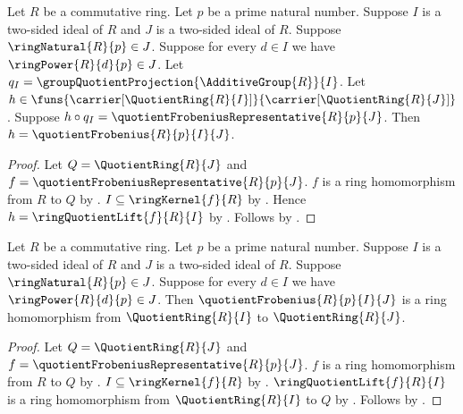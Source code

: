 \begin{theorem}\label{quotient_frobenius_unique}
    Let $R$ be a commutative ring.
    Let $p$ be a prime natural number.
    Suppose $I$ is a two-sided ideal of $R$ and
        $J$ is a two-sided ideal of $R$.
    Suppose $\ringNatural{R}{p}\in J$.
    Suppose for every $d\in I$ we have
        $\ringPower{R}{d}{p}\in J$.
    Let $q_I=\groupQuotientProjection{\AdditiveGroup{R}}{I}$.
    Let $h\in\funs{\carrier[\QuotientRing{R}{I}]}{
        \carrier[\QuotientRing{R}{J}]}$.
    Suppose
        $h\circ q_I=\quotientFrobeniusRepresentative{R}{p}{J}$.
    Then $h=\quotientFrobenius{R}{p}{I}{J}$.
\end{theorem}
\begin{proof}
    Let $Q=\QuotientRing{R}{J}$ and
        $f=\quotientFrobeniusRepresentative{R}{p}{J}$.
    $f$ is a ring homomorphism from $R$ to $Q$ by
        .
    $I\subseteq\ringKernel{f}{R}$ by
        .
    Hence $h=\ringQuotientLift{f}{R}{I}$ by
        .
    Follows by .
\end{proof}

\begin{theorem}\label{quotient_frobenius_hom}
    Let $R$ be a commutative ring.
    Let $p$ be a prime natural number.
    Suppose $I$ is a two-sided ideal of $R$ and
        $J$ is a two-sided ideal of $R$.
    Suppose $\ringNatural{R}{p}\in J$.
    Suppose for every $d\in I$ we have
        $\ringPower{R}{d}{p}\in J$.
    Then $\quotientFrobenius{R}{p}{I}{J}$ is a ring homomorphism
        from $\QuotientRing{R}{I}$ to $\QuotientRing{R}{J}$.
\end{theorem}
\begin{proof}
    Let $Q=\QuotientRing{R}{J}$ and
        $f=\quotientFrobeniusRepresentative{R}{p}{J}$.
    $f$ is a ring homomorphism from $R$ to $Q$ by
        .
    $I\subseteq\ringKernel{f}{R}$ by
        .
    $\ringQuotientLift{f}{R}{I}$ is a ring homomorphism from
        $\QuotientRing{R}{I}$ to $Q$ by
        .
    Follows by .
\end{proof}

